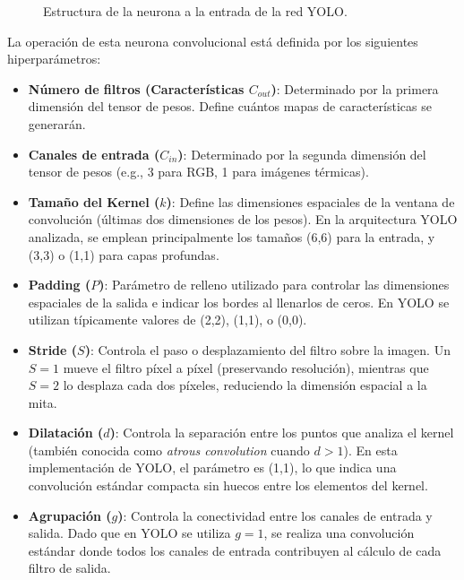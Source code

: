 \documentclass{article}
\begin{document}
\begin{figure}[H]
		\caption{Estructura de la neurona a la entrada de la red YOLO.}
		\label{fig:neuronaInit}
	\end{figure}
	
	La operación de esta neurona convolucional está definida por los siguientes hiperparámetros:
	\begin{itemize}
		\item \textbf{Número de filtros (Características \(C_{out}\))}: Determinado por la primera dimensión del tensor de pesos. Define cuántos mapas de características se generarán.
		\item \textbf{Canales de entrada ($C_{in}$)}: Determinado por la segunda dimensión del tensor de pesos (e.g., 3 para RGB, 1 para imágenes térmicas).
		\item \textbf{Tamaño del Kernel ($k$)}: Define las dimensiones espaciales de la ventana de convolución (últimas dos dimensiones de los pesos). En la arquitectura YOLO analizada, se emplean principalmente los tamaños (6,6) para la entrada, y (3,3) o (1,1) para capas profundas.
		\item \textbf{Padding ($P$)}: Parámetro de relleno utilizado para controlar las dimensiones espaciales de la salida e indicar los bordes al llenarlos de ceros. En YOLO se utilizan típicamente valores de (2,2), (1,1), o (0,0).
		\item \textbf{Stride ($S$)}: Controla el paso o desplazamiento del filtro sobre la imagen. Un $S=1$ mueve el filtro píxel a píxel (preservando resolución), mientras que $S=2$ lo desplaza cada dos píxeles, reduciendo la dimensión espacial a la mita.
		\item \textbf{Dilatación ($d$)}: Controla la separación entre los puntos que analiza el kernel (también conocida como \textit{atrous convolution} cuando $d > 1$). En esta implementación de YOLO, el parámetro es (1,1), lo que indica una convolución estándar compacta sin huecos entre los elementos del kernel.
		\item \textbf{Agrupación ($g$)}: Controla la conectividad entre los canales de entrada y salida. Dado que en YOLO se utiliza $g=1$, se realiza una convolución estándar donde todos los canales de entrada contribuyen al cálculo de cada filtro de salida.
	\end{itemize}
	
\end{document}
